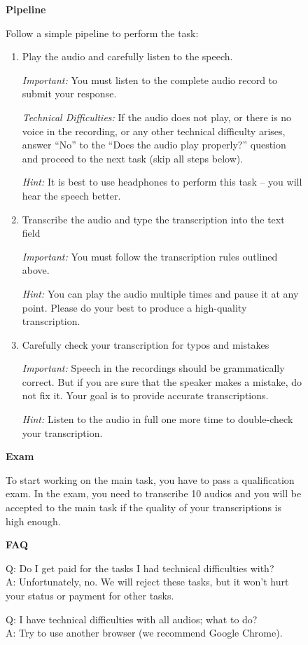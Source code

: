 \documentclass{article}
\begin{document}
\begin{figure}[htbp]
{{\textbf{Pipeline}\smallskip

Follow a simple pipeline to perform the task:
\begin{enumerate}
\item Play the audio and carefully listen to the speech.

\textit{Important:} You must listen to the complete audio record to submit your response.

\textit{Technical Difficulties:} If the audio does not play, or there is no voice in the recording, or any other technical difficulty arises, answer ``No'' to the ``Does the audio play properly?'' question and proceed to the next task (skip all steps below).

\textit{Hint:} It is best to use headphones to perform this task -- you will hear the speech better.
\item Transcribe the audio and type the transcription into the text field

\textit{Important:} You must follow the transcription rules outlined above.

\textit{Hint:} You can play the audio multiple times and pause it at any point.
Please do your best to produce a high-quality transcription.
\item Carefully check your transcription for typos and mistakes

\textit{Important:} Speech in the recordings should be grammatically correct. But if you are sure that the speaker makes a mistake, do not fix it. Your goal is to provide accurate transcriptions.

\textit{Hint:} Listen to the audio in full one more time to double-check your transcription.
\end{enumerate}

\textbf{Exam}\smallskip

To start working on the main task, you have to pass a qualification exam. In the exam, you need to transcribe 10 audios and you will be accepted to the main task if the quality of your transcriptions is high enough.

\medskip\textbf{FAQ}\smallskip

Q: Do I get paid for the tasks I had technical difficulties with?\\
A: Unfortunately, no. We will reject these tasks, but it won't hurt your status or payment for other tasks.

\smallskip

Q: I have technical difficulties with all audios; what to do?\\
A: Try to use another browser (we recommend Google Chrome).

}}
\end{figure}
\end{document}
